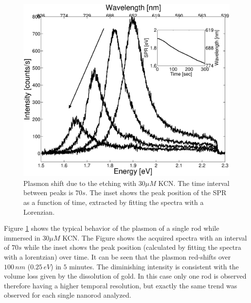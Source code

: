 \documentclass[twocolumn]{article}
\begin{document}
\begin{figure}[htb]
 \centering
 \includegraphics[width=0.9\linewidth]{plasmon_single_rod.eps}
 \caption{Plasmon shift due to the etching with $30\mu M$ KCN. The time
 interval between peaks is $70s$. The inset shows the peak position of the SPR as a
 function of time, extracted by fitting the spectra with a Lorenzian.}
 \label{fig:plasmon_single_rod}
\end{figure}

Figure \ref{fig:plasmon_single_rod} shows the typical behavior of the plasmon of
a single rod while immersed in $30\mu M$ KCN. The Figure shows the acquired
spectra with an interval of $70s$ while the inset shows the peak position
(calculated by fitting the spectra with a lorentzian) over time. It can be seen
that the plasmon red-shifts over $100\, nm$ ($0.25\, eV$) in $5$ minutes. The
diminishing intensity is consistent with the volume loss given by the
dissolution of gold. In this case only one rod is observed therefore having a
higher temporal resolution, but exactly the same trend was observed for each
single nanorod analyzed.
\end{document}
